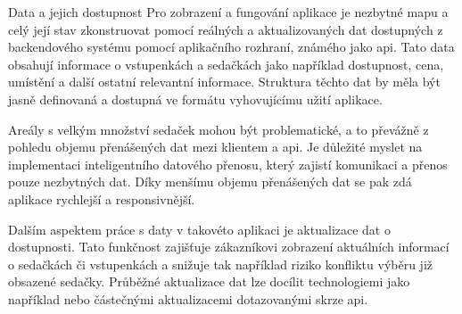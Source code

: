 \begin{subsection}{Data a jejich dostupnost}
    \label{subsec:identifikace-interaktivni-mapa-data-a-dostupnost}
    Pro zobrazení a fungování aplikace je nezbytné mapu a celý její stav zkonstruovat pomocí reálných a aktualizovaných dat dostupných z backendového systému pomocí aplikačního rozhraní, známého jako \ac{api}.
    Tato data obsahují informace o vstupenkách a sedačkách jako například dostupnost, cena, umístění a další ostatní relevantní informace.
    Struktura těchto dat by měla být jasně definovaná a dostupná ve formátu vyhovujícímu užití aplikace.

    Areály s velkým množství sedaček mohou být problematické, a to převážně z pohledu objemu přenášených dat mezi klientem a \ac{api}.
    Je důležité myslet na implementaci inteligentního datového přenosu, který zajistí komunikaci a přenos pouze nezbytných dat.
    Díky menšímu objemu přenášených dat se pak zdá aplikace rychlejší a responsivnější.

    Dalším aspektem práce s daty v takovéto aplikaci je aktualizace dat o dostupnosti.
    Tato funkčnost zajišťuje zákazníkovi zobrazení aktuálních informací o sedačkách či vstupenkách a snižuje tak například riziko konfliktu výběru již obsazené sedačky.
    Průběžné aktualizace dat lze docílit technologiemi jako například  nebo částečnými aktualizacemi dotazovanými skrze \ac{api}.
\end{subsection}
